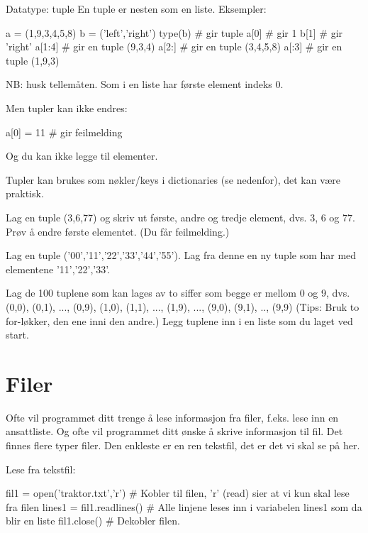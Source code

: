 {Datatype: tuple
En tuple er nesten som en liste.
Eksempler: 
\begin{usncodebox}
a = (1,9,3,4,5,8)
b = ('left','right')
type(b)    # gir tuple
a[0]       # gir 1 
b[1]       # gir 'right'
a[1:4]     # gir en tuple (9,3,4)
a[2:]      # gir en tuple (3,4,5,8)
a[:3]      # gir en tuple (1,9,3)
\end{usncodebox}

NB: husk tellemåten. Som i en liste har første element indeks 0. 

Men tupler kan ikke endres:
\begin{usncodebox}
a[0] = 11  # gir feilmelding
\end{usncodebox}

Og du kan ikke legge til elementer. 

Tupler kan brukes som nøkler/keys i dictionaries (se nedenfor), det kan være praktisk. 

\begin{question}
Lag en tuple (3,6,77) og skriv ut første, andre og tredje element, dvs. 3, 6 og 77.
Prøv å endre første elementet. (Du får feilmelding.) 
\end{question}

\begin{question}
Lag en tuple ('00','11','22','33','44','55'). Lag fra denne en ny tuple som har med elementene '11','22','33'. 
\end{question}

\begin{question}
Lag de 100 tuplene som kan lages av to siffer som begge er mellom 0 og 9, dvs. (0,0), (0,1), ..., (0,9), (1,0), (1,1), ..., (1,9), ..., (9,0), (9,1), .., (9,9)
(Tips: Bruk to for-løkker, den ene inni den andre.)
Legg tuplene inn i en liste som du laget ved start.
\end{question}

\section{Filer}

Ofte vil programmet ditt trenge å lese informasjon fra filer, f.eks. lese inn en ansattliste. Og ofte vil programmet ditt ønske å skrive informasjon til fil. Det finnes flere typer filer. Den enkleste er en ren tekstfil, det er det vi skal se på her. 

Lese fra tekstfil:
\begin{usncodebox}
fil1 = open('traktor.txt','r')    # Kobler til filen, 'r' (read) sier at vi kun skal lese fra filen
lines1 = fil1.readlines()         # Alle linjene leses inn i variabelen lines1 som da blir en liste
fil1.close()                      # Dekobler filen. 
\end{usncodebox}

}
